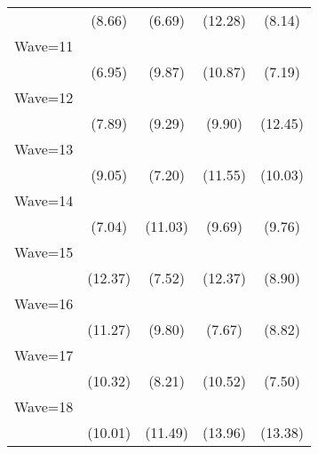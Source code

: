 {\begin{tabular}{l*{4}{c}}
                    &      (8.66)         &      (6.69)         &     (12.28)         &      (8.14)         \\
[1em]
Wave=11             &            \sym{***}&            \sym{***}&            \sym{***}&            \sym{***}\\
                    &      (6.95)         &      (9.87)         &     (10.87)         &      (7.19)         \\
[1em]
Wave=12             &            \sym{***}&            \sym{***}&            \sym{***}&            \sym{***}\\
                    &      (7.89)         &      (9.29)         &      (9.90)         &     (12.45)         \\
[1em]
Wave=13             &            \sym{***}&            \sym{***}&            \sym{***}&            \sym{***}\\
                    &      (9.05)         &      (7.20)         &     (11.55)         &     (10.03)         \\
[1em]
Wave=14             &            \sym{***}&            \sym{***}&            \sym{***}&            \sym{***}\\
                    &      (7.04)         &     (11.03)         &      (9.69)         &      (9.76)         \\
[1em]
Wave=15             &            \sym{***}&            \sym{***}&            \sym{***}&            \sym{***}\\
                    &     (12.37)         &      (7.52)         &     (12.37)         &      (8.90)         \\
[1em]
Wave=16             &            \sym{***}&            \sym{***}&            \sym{***}&            \sym{***}\\
                    &     (11.27)         &      (9.80)         &      (7.67)         &      (8.82)         \\
[1em]
Wave=17             &            \sym{***}&            \sym{***}&            \sym{***}&            \sym{***}\\
                    &     (10.32)         &      (8.21)         &     (10.52)         &      (7.50)         \\
[1em]
Wave=18             &            \sym{***}&            \sym{***}&            \sym{***}&            \sym{***}\\
                    &     (10.01)         &     (11.49)         &     (13.96)         &     (13.38)         \\

\end{tabular}}
